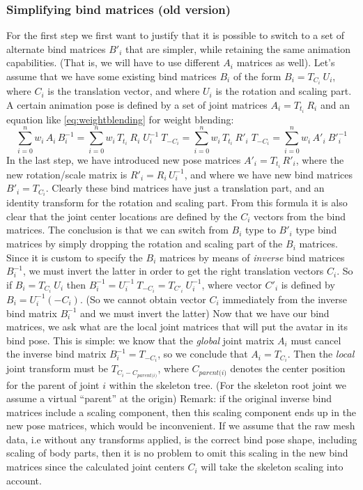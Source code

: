 \subsubsection{Simplifying bind matrices (old version)}
For the first step we first want to justify that it is possible to switch to a set of alternate bind matrices
$B'_i$ that are simpler, while retaining the same animation capabilities.
(That is, we will have to use different $A_i$ matrices as well).
Let's assume that we have some existing bind matrices $B_i$ of the form $B_i = T_{C_i}\:U_i$, where
$C_i$ is the translation vector, and where $U_i$ is the rotation and scaling part.
A certain animation pose is defined by a set of joint matrices $A_i= T_{t_i}\: R_i$ and
an equation like \autoref{eq:weightblending} for weight blending:
\begin{equation}\label{eq:animationpose}
 \sum_{i=0}^{n} w_i\, A_i\,B_i^{-1}
 = \sum_{i=0}^{n} w_i\, T_{t_i}\:R_i\;U_i^{-1}\: T_{-C_i}
 = \sum_{i=0}^{n} w_i\, T_{t_i}\:R'_i\; T_{-C_i}
 = \sum_{i=0}^{n} w_i\, A'_i\:{B'}_i^{-1}
\end{equation}
In the last step, we have introduced new pose matrices $A'_i = T_{t_i}\,R'_i$, where the new rotation/scale matrix is $R'_i =R_i\,U_i^{-1}$,
and where we have new bind matrices $B'_i = T_{C_i}$. Clearly these bind matrices have just a translation part,
and an identity transform for the rotation and scaling part.
From this formula it is also clear that the joint center locations are defined by the $C_i$ vectors
from the bind matrices.
The conclusion is that we can switch from $B_i$ type to $B'_i$ type bind matrices by simply dropping
 the rotation and scaling part of the $B_i$  matrices.
Since it is custom to specify the $B_i$ matrices by means of \emph{inverse} bind matrices $B_i^{-1}$,
we must invert the latter  in order to get the right
translation vectors $C_i$. So  if $B_i = T_{C_i}\:U_i$ then $B_i^{-1} = U_i^{-1}\: T_{-C_i} = T_{C'_i}\:U_i^{-1}$,
where vector $C'_i$ is defined by $B_i = U_i^{-1}(-C_i)$.
(So we cannot obtain vector $C_i$ immediately from the inverse bind matrix $B_i^{-1}$ and we must invert the latter)
Now that we have our bind matrices, we ask what are the local joint matrices that will put
the avatar in its bind pose. This is simple: we know that the \emph{global} joint matrix $A_i$
must cancel the inverse bind matrix $B_i^{-1} = T_{-C_i}$, so we conclude that $A_i = T_{C_i}$.
Then the \emph{local} joint transform must be $T_{C_i - C_{\textit{parent(i)}}}$,
where $C_{\textit{parent(i)}}$ denotes the center position for the parent of joint $i$ within
the skeleton tree. (For the skeleton root joint we assume a virtual ``parent''  at the origin)
Remark: if the original inverse bind matrices include a scaling component, then this scaling
component ends up in the new pose matrices, which would be inconvenient.
If we assume that the raw mesh data, i.e without any transforms applied, is the correct
bind pose shape, including scaling of body parts, then it is no problem to omit this scaling in the
new bind matrices since the calculated joint centers $C_i$ will take the skeleton scaling into account.


